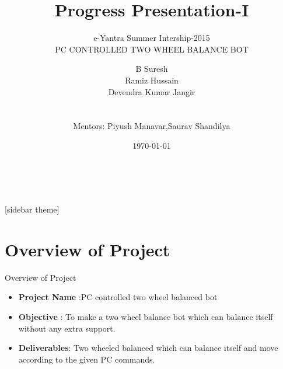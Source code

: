 \documentclass[10pt, a4paper]{beamer}
\begin{document}
	\title{Progress Presentation-I}
	\subtitle{e-Yantra Summer Intership-2015 \\ PC CONTROLLED TWO WHEEL BALANCE BOT}
	\author{B Suresh\\Ramiz Hussain\\Devendra Kumar Jangir \\ \\ \\
	Mentors: Piyush Manavar,Saurav Shandilya} \\
	\date{\today}
	\frame{\titlepage}

[sidebar theme]
\section{Overview of Project}
\begin{frame}{Overview of Project}
	\begin{itemize}
		\item \textbf{Project Name} :PC controlled two wheel balanced bot\\
		\item \textbf{Objective} : To make a two wheel balance bot which can balance itself without any extra support.\\
		\item \textbf{Deliverables}: Two wheeled balanced which can balance itself and move according to the given PC commands.
		\end{itemize}
\end{frame}
\end{document}
